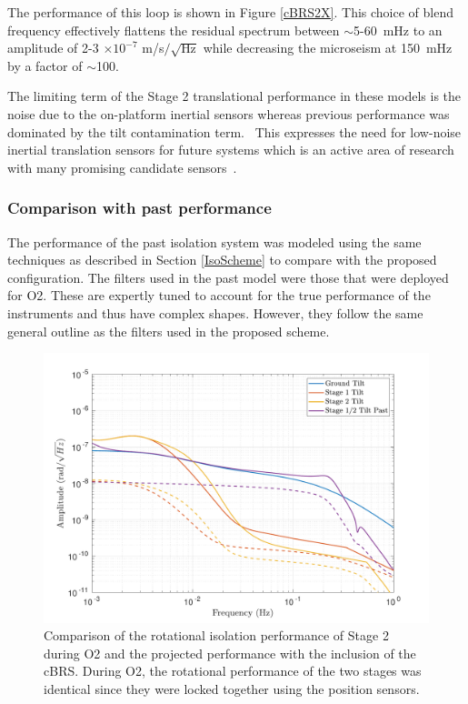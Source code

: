 \documentclass [12pt, proquest]{uwthesis}[2019]
\begin{document}
The performance of this loop is shown in Figure \ref{cBRS2X}. This choice of blend frequency effectively flattens the residual spectrum between $\sim$5-60~mHz to an amplitude of 2-3 $\times 10^{-7}$ m/s$/\sqrt{\text{Hz}}$ while decreasing the microseism at 150~mHz by a factor of $\sim$100.

The limiting term of the Stage 2 translational performance in these models is the noise due to the on-platform inertial sensors whereas previous performance was dominated by the tilt contamination term.~\cite{windproofing} This expresses the need for low-noise inertial translation sensors for future systems which is an active area of research with many promising candidate sensors~\cite{Mow_Lowry_2019, Cooper_2018}. 

\subsubsection{Comparison with past performance}

The performance of the past isolation system was modeled using the same techniques as described in Section \ref{IsoScheme} to compare with the proposed configuration. The filters used in the past model were those that were deployed for O2. These are expertly tuned to account for the true performance of the instruments and thus have complex shapes. However, they follow the same general outline as the filters used in the proposed scheme.

\begin{figure}[!h]
\begin{center}
\includegraphics[width=\textwidth]{cBRS_Model_CompRX.pdf}
\caption[Comparison of the rotational isolation performance of Stage 2 during O2 and the projected performance with the inclusion of the cBRS]{Comparison of the rotational isolation performance of Stage 2 during O2 and the projected performance with the inclusion of the cBRS. During O2, the rotational performance of the two stages was identical since they were locked together using the position sensors.}
\label{cBRSCompR}
\end{center}
\end{figure}
\end{document}

